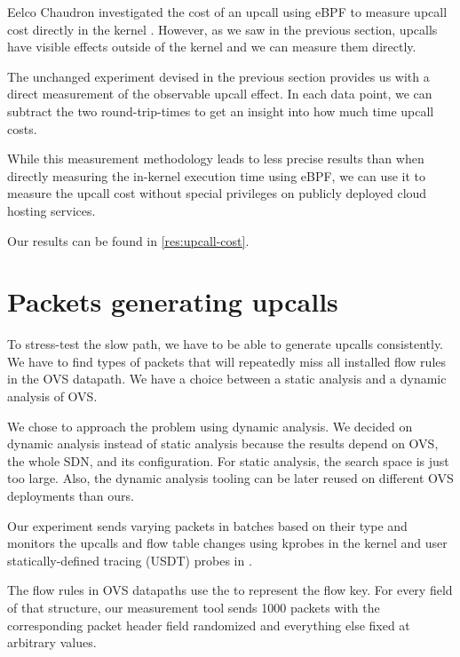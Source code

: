 Eelco Chaudron investigated the cost of an upcall using eBPF to measure upcall cost directly in the kernel \cite{UpcallCost}. However, as we saw in the previous section, upcalls have visible effects outside of the kernel and we can measure them directly.

The unchanged experiment devised in the previous section provides us with a direct measurement of the observable upcall effect. In each data point, we can subtract the two round-trip-times to get an insight into how much time upcall costs.

While this measurement methodology leads to less precise results than when directly measuring the in-kernel execution time using eBPF, we can use it to measure the upcall cost without special privileges on publicly deployed cloud hosting services.

Our results can be found in \cref{res:upcall-cost}.

\section{Packets generating upcalls}
\label{design:upcall-generators}

To stress-test the slow path, we have to be able to generate upcalls consistently. We have to find types of packets that will repeatedly miss all installed flow rules in the OVS datapath. We have a choice between a static analysis and a dynamic analysis of OVS.

We chose to approach the problem using dynamic analysis. We decided on dynamic analysis instead of static analysis because the results depend on OVS, the whole SDN, and its configuration. For static analysis, the search space is just too large. Also, the dynamic analysis tooling can be later reused on different OVS deployments than ours.

Our experiment sends varying packets in batches based on their type and monitors the upcalls and flow table changes using kprobes in the kernel and user statically-defined tracing (USDT) probes in .

The flow rules in OVS datapaths use the \href{https://elixir.bootlin.com/linux/v6.2.15/source/net/openvswitch/flow.h\#L75}{} to represent the flow key. For every field of that structure, our measurement tool sends 1000 packets with the corresponding packet header field randomized and everything else fixed at arbitrary values.

